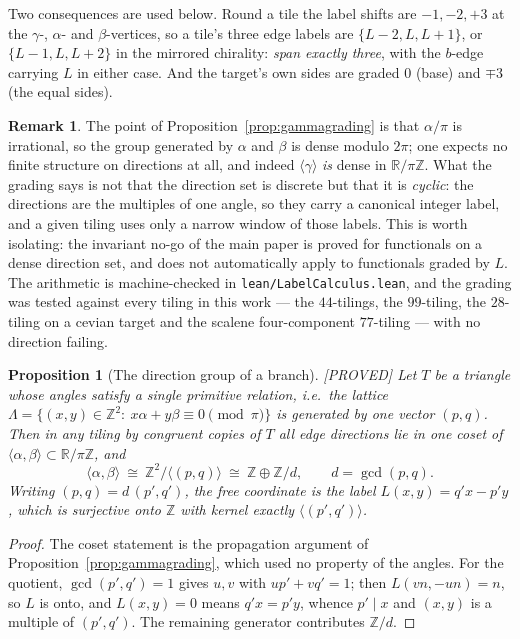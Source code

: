 \documentclass[11pt,reqno]{amsart}
\theoremstyle{plain}
\newtheorem{proposition}[theorem]{Proposition}
\theoremstyle{definition}
\newtheorem{remark}[theorem]{Remark}
\newcommand{\R}{\mathbb{R}}
\newcommand{\Z}{\mathbb{Z}}
\newcommand{\lab}[1]{\hfill\textnormal{\footnotesize\textsc{[#1]}}}
\begin{document}
Two consequences are used below. Round a tile the label shifts are $-1,-2,+3$ at the $\gamma$-,
$\alpha$- and $\beta$-vertices, so a tile's three edge labels are $\{L-2,L,L+1\}$, or
$\{L-1,L,L+2\}$ in the mirrored chirality: \emph{span exactly three}, with the $b$-edge carrying $L$
in either case. And the target's own sides are graded $0$ (base) and $\mp3$ (the equal sides).

\begin{remark}
The point of Proposition~\ref{prop:gammagrading} is that $\alpha/\pi$ is irrational, so the group
generated by $\alpha$ and $\beta$ is dense modulo $2\pi$; one expects no finite structure on
directions at all, and indeed $\langle\gamma\rangle$ \emph{is} dense in $\R/\pi\Z$. What the grading
says is not that the direction set is discrete but that it is \emph{cyclic}: the directions are the
multiples of one angle, so they carry a canonical integer label, and a given tiling uses only a
narrow window of those labels. This is worth isolating: the invariant no-go of the main paper is
proved for functionals on a dense direction set, and does not automatically apply to functionals
graded by $L$. The arithmetic is machine-checked in
\textup{\texttt{lean/LabelCalculus.lean}}, and the grading was tested against every tiling in this
work --- the $44$-tilings, the $99$-tiling, the $28$-tiling on a cevian target and the scalene
four-component $77$-tiling --- with no direction failing.
\end{remark}

\begin{proposition}[The direction group of a branch]\label{prop:dirgroup}\lab{PROVED}
Let $T$ be a triangle whose angles satisfy a single primitive relation, i.e.\ the lattice
$\Lambda=\{(x,y)\in\Z^2:\ x\alpha+y\beta\equiv0 \pmod\pi\}$ is generated by one vector $(p,q)$. Then
in any tiling by congruent copies of $T$ all edge directions lie in one coset of
$\langle\alpha,\beta\rangle\subset\R/\pi\Z$, and
\[
\langle\alpha,\beta\rangle\ \cong\ \Z^2/\langle(p,q)\rangle\ \cong\ \Z\oplus\Z/d,
\qquad d=\gcd(p,q).
\]
Writing $(p,q)=d\,(p',q')$, the free coordinate is the label $L(x,y)=q'x-p'y$, which is surjective
onto $\Z$ with kernel exactly $\langle(p',q')\rangle$.
\end{proposition}
\begin{proof}
The coset statement is the propagation argument of Proposition~\ref{prop:gammagrading}, which used
no property of the angles. For the quotient, $\gcd(p',q')=1$ gives $u,v$ with $up'+vq'=1$; then
$L(vn,-un)=n$, so $L$ is onto, and $L(x,y)=0$ means $q'x=p'y$, whence $p'\mid x$ and $(x,y)$ is a
multiple of $(p',q')$. The remaining generator contributes $\Z/d$.
\end{proof}
\end{document}
